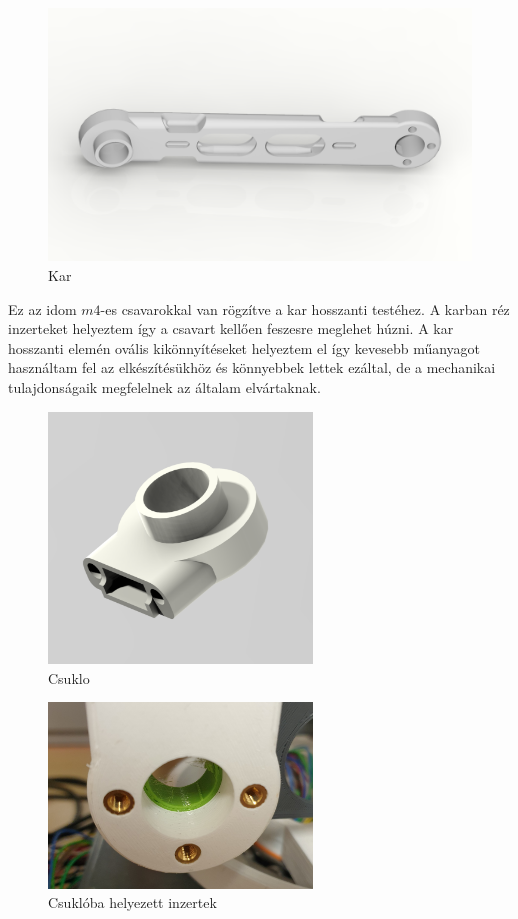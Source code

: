\begin{figure}[!ht]
\centering
\includegraphics[width=150mm, keepaspectratio]{figures/Diploma_CAD/creo3.png}
\caption{Kar}
\label{fig:kar}
\end{figure}

Ez az idom $m4$-es csavarokkal van rögzítve a kar hosszanti testéhez. A karban réz inzerteket helyeztem így a csavart kellően feszesre meglehet húzni. A kar hosszanti elemén ovális kikönnyítéseket helyeztem el így kevesebb műanyagot használtam fel az elkészítésükhöz és könnyebbek lettek ezáltal, de a mechanikai tulajdonságaik megfelelnek az általam elvártaknak.

\begin{figure}[!ht]
\centering
\includegraphics[width=70mm, keepaspectratio]{figures/Diploma_CAD/creo4.png}
\caption{Csuklo}
\label{fig:Csuklo_egyedul}
\end{figure}

\begin{figure}[!ht]
\centering
\includegraphics[width=70mm, keepaspectratio]{figures/Szumma/Inzert}
\caption{Csuklóba helyezett inzertek}
\label{fig:Csuklo_inzert}
\end{figure}


